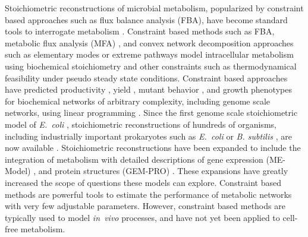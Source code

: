 \documentclass[journal=asbcd6,manuscript=article]{achemso}
\begin{document}
Stoichiometric reconstructions of microbial metabolism, popularized by constraint based approaches such as flux balance analysis (FBA), have become standard tools to interrogate metabolism \cite{2012_lewis_palsson_NatRevMicrobio}.
Constraint based methods such as FBA, metabolic flux analysis (MFA) \cite{WIECHERT2001195}, and convex network decomposition approaches such as elementary modes \cite{Schuster:2000aa} or extreme pathways \cite{Schilling:2000aa} model intracellular metabolism using biochemical stoichiometry and other constraints such as thermodynamical feasibility \cite{Henry:2007,Hamilton:2013} under pseudo steady state conditions.
Constraint based approaches have predicted productivity \cite{Varma01101994, BTPR:BTPR2132}, yield \cite{Varma01101994}, mutant behavior \cite{Edwards2000}, and growth phenotypes \cite{Brien693} for biochemical networks of arbitrary complexity, including genome scale networks, using linear programming \cite{Covert:2004aa}.
Since the first genome scale stoichiometric model of \textit{E.~coli} \cite{2000_edwards_palsson_PNAS}, stoichiometric reconstructions of hundreds of organisms, including industrially important prokaryotes such as \textit{E.~coli} \cite{Feist:2007aa} or \textit{B. subtilis} \cite{Oh:2007aa}, are now available \cite{2009_feist_palsson_NatRevMicrobio}.
Stoichiometric reconstructions have been expanded to include the integration of metabolism with detailed descriptions of gene expression (ME-Model) \cite{Allen:2003aa, Brien693},
and protein structures (GEM-PRO) \cite{Zhang1544,Chang1220}.
These expansions have greatly increased the scope of questions these models can explore.
Constraint based methods are powerful tools to estimate the performance of metabolic networks with very few adjustable parameters.
However, constraint based methods are typically used to model \textit{in~vivo} processes, and have not yet been applied to cell-free metabolism.
\end{document}
